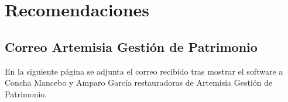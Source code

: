 \chapter{Recomendaciones}
\label{appendix:correo-artemisia}

\section{Correo Artemisia Gestión de Patrimonio}

En la siguiente página se adjunta el correo recibido tras mostrar el software a Concha Mancebo y Amparo García restauradoras de Artemisia Gestión de Patrimonio.

